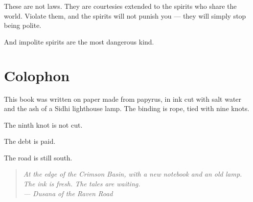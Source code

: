 \documentclass[10pt,twoside]{book}
\newcommand{\dusana}[1]{\begin{quote}\itshape #1 \\ --- Dusana of the Raven Road\end{quote}}
\begin{document}
These are not laws. They are courtesies extended to the spirits who share the world. Violate them, and the spirits will not punish you --- they will simply stop being polite.

And impolite spirits are the most dangerous kind.

\chapter*{Colophon}

This book was written on paper made from papyrus, in ink cut with salt water and the ash of a Sidhi lighthouse lamp. The binding is rope, tied with nine knots.

The ninth knot is not cut.

The debt is paid.

The road is still south.

\dusana{At the edge of the Crimson Basin, with a new notebook and an old lamp. The ink is fresh. The tales are waiting.}
\end{document}
